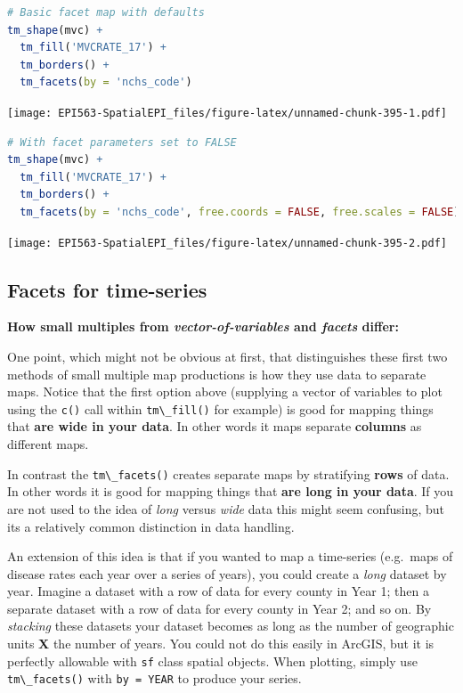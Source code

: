 \documentclass[
]{book}
\newcommand{\passthrough}[1]{#1}
\begin{document}
\begin{lstlisting}[language=R]
# Basic facet map with defaults
tm_shape(mvc) +
  tm_fill('MVCRATE_17') +
  tm_borders() +
  tm_facets(by = 'nchs_code')
\end{lstlisting}

\texttt{[image: EPI563-SpatialEPI\_files/figure-latex/unnamed-chunk-395-1.pdf]}

\begin{lstlisting}[language=R]
# With facet parameters set to FALSE
tm_shape(mvc) +
  tm_fill('MVCRATE_17') +
  tm_borders() +
  tm_facets(by = 'nchs_code', free.coords = FALSE, free.scales = FALSE)
\end{lstlisting}

\texttt{[image: EPI563-SpatialEPI\_files/figure-latex/unnamed-chunk-395-2.pdf]}

\hypertarget{facets-for-time-series}{%
\subsection{Facets for time-series}\label{facets-for-time-series}}

\textbf{How small multiples from \emph{vector-of-variables} and \emph{facets} differ:}

One point, which might not be obvious at first, that distinguishes these first two methods of small multiple map productions is how they use data to separate maps. Notice that the first option above (supplying a vector of variables to plot using the \passthrough{\lstinline!c()!} call within \passthrough{\lstinline!tm\_fill()!} for example) is good for mapping things that \textbf{are wide in your data}. In other words it maps separate \textbf{columns} as different maps.

In contrast the \passthrough{\lstinline!tm\_facets()!} creates separate maps by stratifying \textbf{rows} of data. In other words it is good for mapping things that \textbf{are long in your data}. If you are not used to the idea of \emph{long} versus \emph{wide} data this might seem confusing, but its a relatively common distinction in data handling.

An extension of this idea is that if you wanted to map a time-series (e.g.~maps of disease rates each year over a series of years), you could create a \emph{long} dataset by year. Imagine a dataset with a row of data for every county in Year 1; then a separate dataset with a row of data for every county in Year 2; and so on. By \emph{stacking} these datasets your dataset becomes as long as the number of geographic units \textbf{X} the number of years. You could not do this easily in ArcGIS, but it is perfectly allowable with \passthrough{\lstinline!sf!} class spatial objects. When plotting, simply use \passthrough{\lstinline!tm\_facets()!} with \passthrough{\lstinline!by = YEAR!} to produce your series.
\end{document}

